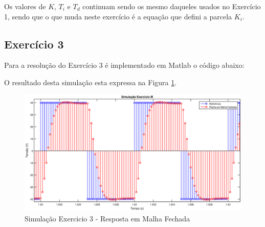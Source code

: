 	Os valores de $K$, $T_i$ e $T_d$ continuam sendo os mesmo daqueles usados no Exercício 1, sendo que o que muda neste exercício é a equação que defini a parcela $K_i$.
	
	\subsection{Exercício 3}
	
	Para a resolução do Exercício 3 é implementado em Matlab o código abaixo:
	
	
	O resultado desta simulação esta expressa na Figura \ref{fig:Exercicio3}.  
	
	\begin{figure}[H]
		\includegraphics[scale = .5]{Imagens/ExercicioIII.eps}
		\caption{Simulação Exercicio 3 - Resposta em Malha Fechada}
		\label{fig:Exercicio3}
	\end{figure}